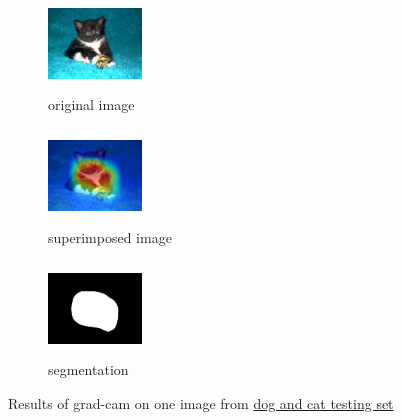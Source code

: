 \documentclass[../ImageClassifier.tex]{subfiles}
\begin{document}
    \begin{figure}[H]
        \begin{subfigure}{.32\textwidth}
          \centering
          \includegraphics[height=2.5cm, width=2.5cm]{./attachments/results/19-cat.jpg}
          \caption{original image}
          \label{fig:original image}
        \end{subfigure}
        \begin{subfigure}{.32\textwidth}
          \centering
          \includegraphics[height=2.5cm, width=2.5cm]{./attachments/results/19-cat-grad.jpg}
          \caption{superimposed image}
          \label{fig:heatmap activasion}
        \end{subfigure}
        \begin{subfigure}{.32\textwidth}
            \centering
            \includegraphics[height=2.5cm, width=2.5cm]{./attachments/results/19-cat-seg.jpg}
            \caption{segmentation}
            \label{fig:heatmap resized}
        \end{subfigure}
        \caption{Results of \ac{grad-cam} on one image from \href{https://www.kaggle.com/tongpython/cat-and-dog?}{dog and cat testing set}}
        \label{fig:grad cam cat and dog}
    \end{figure}
\end{document}
